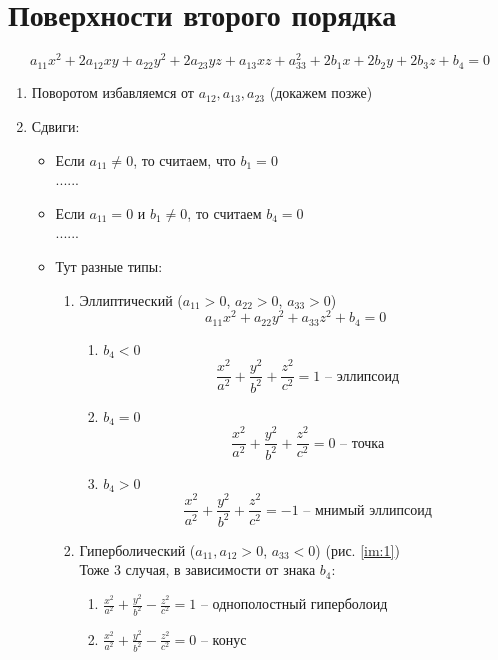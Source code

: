 \chapter{Поверхности второго порядка}

$$ a_{11}x^2 + 2a_{12}xy + a_{22}y^2 + 2a_{23}yz + a_{13}xz + a_{33}^2 + 2b_1x + 2b_2y + 2b_3z + b_4 = 0 $$

\begin{algorithm}
    \hfill
    \begin{enumerate}
        \item Поворотом избавляемся от $a_{12}, a_{13}, a_{23}$ (докажем позже)
        \item Сдвиги:
        \begin{itemize}
            \item Если $a_{11} \ne 0$, то считаем, что $b_1 = 0$ \\
            ......
            \item Если $a_{11} = 0$ и $b_1 \ne 0$, то считаем $b_4 = 0$ \\
            ......
            \item Тут разные типы:
            \begin{enumerate}
                \item Эллиптический ($a_{11} > 0$, $a_{22} > 0$, $a_{33} > 0$)
                $$ a_{11}x^2 + a_{22}y^2 + a_{33}z^2 + b_4 = 0 $$
                \begin{enumerate}
                    \item $b_4 < 0$
                    $$ \frac{x^2}{a^2} + \frac{y^2}{b^2} + \frac{z^2}{c^2} = 1 \text{ -- эллипсоид} $$
                    \item $b_4 = 0$
                    $$ \frac{x^2}{a^2} + \frac{y^2}{b^2} + \frac{z^2}{c^2} = 0 \text{ -- точка} $$
                    \item $b_4 > 0$
                    $$ \frac{x^2}{a^2} + \frac{y^2}{b^2} + \frac{z^2}{c^2} = -1 \text{ -- мнимый эллипсоид} $$
                \end{enumerate}
                \item Гиперболический ($a_{11}, a_{12} > 0$, $a_{33} < 0$) (рис. \ref{im:1}) \\
                Тоже 3 случая, в зависимости от знака $b_4$:
                \begin{enumerate}
                    \item $ \frac{x^2}{a^2} + \frac{y^2}{b^2} - \frac{z^2}{c^2} = 1 $ -- однополостный гиперболоид
                    \item $ \frac{x^2}{a^2} + \frac{y^2}{b^2} - \frac{z^2}{c^2} = 0 $ -- конус

\end{enumerate}
\end{enumerate}
\end{itemize}
\end{enumerate}
\end{algorithm}
